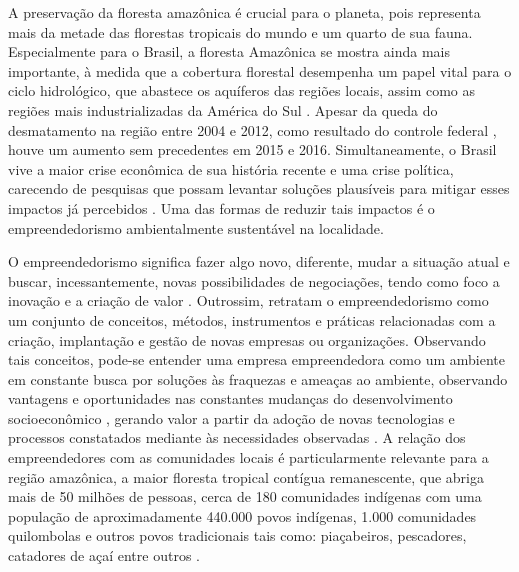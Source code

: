 A preservação da floresta amazônica é crucial para o planeta, pois representa mais da metade das florestas tropicais do mundo e um quarto de sua fauna. Especialmente para o Brasil, a floresta Amazônica se mostra ainda mais importante, à medida que a cobertura florestal desempenha um papel vital para o ciclo hidrológico, que abastece os aquíferos das regiões locais, assim como as regiões mais industrializadas da América do Sul \cite{Weng2017UnderstandingCommunities,HenrichsdeAzevedo2021FlowSystem}. Apesar da queda do desmatamento na região entre 2004 e 2012, como resultado do controle federal \cite{SilvaMontes2022TheApproach}, houve um aumento sem precedentes em 2015 e 2016. Simultaneamente, o Brasil vive a maior crise econômica de sua história recente e uma crise política, carecendo de pesquisas que possam levantar soluções plausíveis para mitigar esses impactos já percebidos \cite{Pereira2019PolicyRainforest}. Uma das formas de reduzir tais impactos é o empreendedorismo ambientalmente sustentável na localidade.

O empreendedorismo significa fazer algo novo, diferente, mudar a situação atual e buscar, incessantemente, novas possibilidades de negociações, tendo como foco a inovação e a criação de valor \cite{SocorroMarquez2021TheModel}. Outrossim,  retratam o empreendedorismo como um conjunto de conceitos, métodos, instrumentos e práticas relacionadas com a criação, implantação e gestão de novas empresas ou organizações. Observando tais conceitos, pode-se entender uma empresa empreendedora como um ambiente em constante busca por soluções às fraquezas e ameaças ao ambiente, observando vantagens e oportunidades nas constantes mudanças do desenvolvimento socioeconômico \cite{Shan2018AssessingDevelopment}, gerando valor a partir da adoção de novas tecnologias e processos constatados mediante às necessidades observadas \cite{Trifonova2018EducationalRussia,Ferreira2020a,Peng2022DoesEntrepreneurship}. A relação dos empreendedores com as comunidades locais é particularmente relevante para a região amazônica, a maior floresta tropical contígua remanescente, que abriga mais de 50 milhões de pessoas, cerca de 180 comunidades indígenas com uma população de aproximadamente 440.000 povos indígenas, 1.000 comunidades quilombolas e outros povos tradicionais tais como: piaçabeiros, pescadores, catadores de açaí entre outros \cite{CIMI2017PovosEsperanca}.

